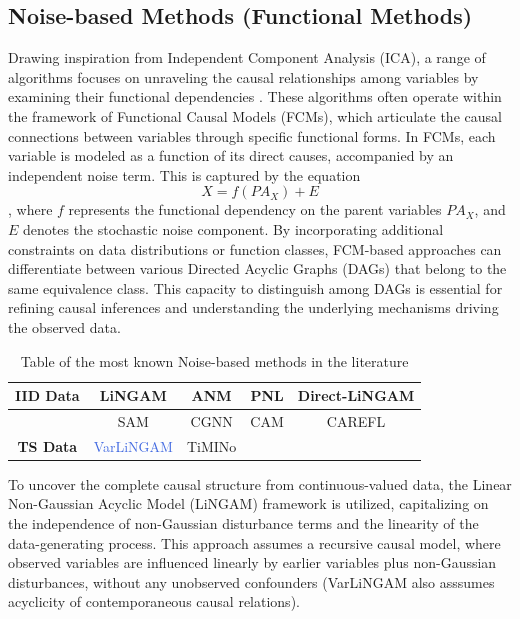 \subsection{Noise-based Methods (Functional Methods)}
Drawing inspiration from Independent Component Analysis (ICA), a range of algorithms focuses on unraveling the causal relationships among variables by examining their functional dependencies \cite{molak2023causal}. These algorithms often operate within the framework of Functional Causal Models (FCMs), which articulate the causal connections between variables through specific functional forms. In FCMs, each variable is modeled as a function of its direct causes, accompanied by an independent noise term. This is captured by the equation $$X = f(PA_X) + E$$, where $f$ represents the functional dependency on the parent variables $PA_{X}$, and $E$ denotes the stochastic noise component. By incorporating additional constraints on data distributions or function classes, FCM-based approaches can differentiate between various Directed Acyclic Graphs (DAGs) that belong to the same equivalence class. This capacity to distinguish among DAGs is essential for refining causal inferences and understanding the underlying mechanisms driving the observed data. \cite{hasan2023survey}\\

\begin{table}[!ht]
    \centering
    \caption{Table of the most known Noise-based methods in the literature}
    \begin{tabular}{|c|c|c|c|c|}
    \hline
        \textbf{IID Data} & LiNGAM & ANM & PNL & Direct-LiNGAM \\ \hline
        \multicolumn{1}{c|}{}  & SAM & CGNN & CAM & CAREFL \\ \hline
        \textbf{TS Data} & \textcolor{RoyalBlue}{VarLiNGAM} & TiMINo & ~ & ~ \\ \hline
    \end{tabular}
    \label{nbM}
\end{table}

To uncover the complete causal structure from continuous-valued data, the Linear Non-Gaussian Acyclic Model (LiNGAM) framework is utilized, capitalizing on the independence of non-Gaussian disturbance terms and the linearity of the data-generating process. This approach assumes a recursive causal model, where observed variables are influenced linearly by earlier variables plus non-Gaussian disturbances, without any unobserved confounders (VarLiNGAM also asssumes acyclicity of contemporaneous causal relations). \cite{shimizu2006linear}\\

